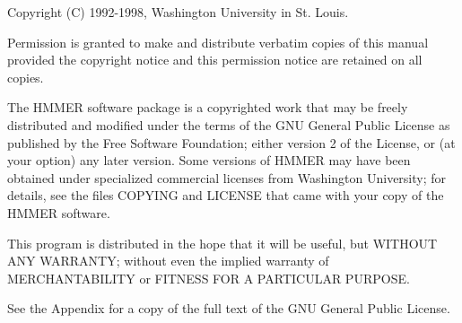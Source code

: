 \vspace*{\fill}
\begin{flushleft}
Copyright (C) 1992-1998, Washington University in St. Louis.\vspace{5mm}

Permission is granted to make and distribute verbatim copies of this
manual provided the copyright notice and this permission notice are
retained on all copies.\vspace{5mm}

The HMMER software package is a copyrighted work that may be freely
distributed and modified under the terms of the GNU General Public
License as published by the Free Software Foundation; either version 2
of the License, or (at your option) any later version. Some versions
of HMMER may have been obtained under specialized commercial licenses
from Washington University; for details, see the files COPYING and
LICENSE that came with your copy of the HMMER software.\vspace{5mm}

This program is distributed in the hope that it will be useful, but
WITHOUT ANY WARRANTY; without even the implied warranty of
MERCHANTABILITY or FITNESS FOR A PARTICULAR PURPOSE.\vspace{5mm}

See the Appendix for a copy of the full text of the GNU General Public
License.\vspace{5mm}

\end{flushleft}
